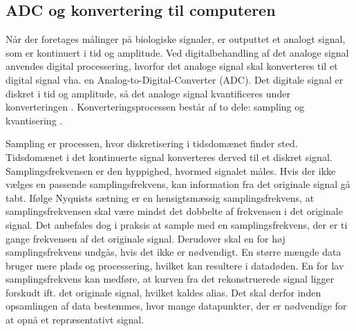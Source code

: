 \subsection{ADC og konvertering til computeren}\label{ADCafsnit}
Når der foretages målinger på biologiske signaler, er outputtet et analogt signal, som er kontinuert i tid og amplitude. Ved digitalbehandling af det analoge signal anvendes digital processering, hvorfor det analoge signal skal konverteres til et digital signal vha. en Analog-to-Digital-Converter (ADC). Det digitale signal er diskret i tid og amplitude, så det analoge signal kvantificeres under konverteringen \cite{webster2009}. Konverteringsprocessen består af to dele: sampling og kvantisering  \cite{Zouridakis2003}.  

Sampling er processen, hvor diskretisering i tidsdomænet finder sted. Tidsdomænet i det kontinuerte signal konverteres derved til et diskret signal. Samplingsfrekvensen er den hyppighed, hvormed signalet måles. Hvis der ikke vælges en passende samplingsfrekvens, kan information fra det originale signal gå tabt. Ifølge Nyquists sætning er en hensigtsmæssig samplingsfrekvens, at samplingsfrekvensen skal være mindst det dobbelte af frekvensen i det originale signal. \cite{Zouridakis2003} Det anbefales dog i praksis at sample med en samplingsfrekvens, der er ti gange frekvensen af det originale signal. Derudover skal en for høj samplingsfrekvens undgås, hvis det ikke er nødvendigt. En større mængde data bruger mere plads og processering, hvilket kan resultere i datadøden. \cite{Wolf2004,Aminoff2012} En for lav samplingsfrekvens kan medføre, at kurven fra det rekonstruerede signal ligger forskudt ift. det originale signal, hvilket kaldes alias. \cite{Zouridakis2003} Det skal derfor inden opsamlingen af data bestemmes, hvor mange datapunkter, der er nødvendige for at opnå et repræsentativt signal.

